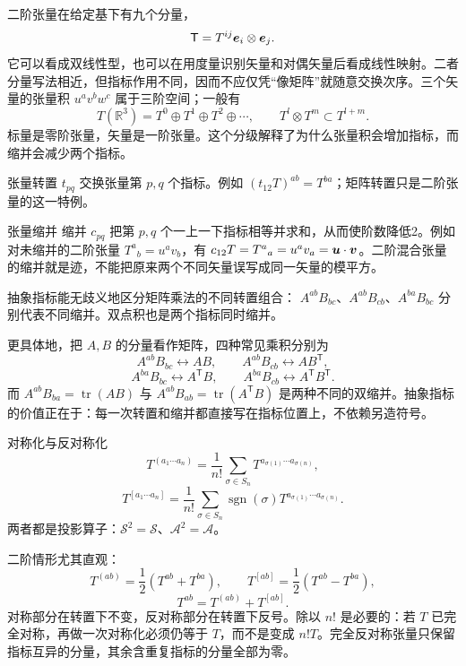 二阶张量在给定基下有九个分量，
\[
 \mathsf T=T^{ij}\bm{e}_i\otimes\bm{e}_j.
\]
它可以看成双线性型，也可以在用度量识别矢量和对偶矢量后看成线性映射。二者分量写法相近，但指标作用不同，因而不应仅凭“像矩阵”就随意交换次序。三个矢量的张量积
$u^av^bw^c$ 属于三阶空间；一般有
\[
 T(\mathbb R^3)=T^0\oplus T^1\oplus T^2\oplus\cdots,
 \qquad T^l\otimes T^m\subset T^{l+m}.
\]
标量是零阶张量，矢量是一阶张量。这个分级解释了为什么张量积会增加指标，而缩并会减少两个指标。

\begin{advdefinition}{张量转置}\label{advA3:def:tensor-transpose}
$t_{pq}$ 交换张量第 $p,q$ 个指标。例如
$(t_{12}T)^{ab}=T^{ba}$；矩阵转置只是二阶张量的这一特例。
\end{advdefinition}

\begin{advdefinition}{张量缩并}\label{advA3:def:contraction}
缩并 $c_{pq}$ 把第 $p,q$ 个一上一下指标相等并求和，从而使阶数降低2。例如
对未缩并的二阶张量 $T^a{}_b=u^av_b$，有 $c_{12}T=T^a{}_a=u^av_a=\bm{u}\cdot\bm{v}$。二阶混合张量的缩并就是迹，不能把原来两个不同矢量误写成同一矢量的模平方。
\end{advdefinition}
抽象指标能无歧义地区分矩阵乘法的不同转置组合：
$A^{ab}B_{bc}$、$A^{ab}B_{cb}$、$A^{ba}B_{bc}$ 分别代表不同缩并。双点积也是两个指标同时缩并。

更具体地，把 $A,B$ 的分量看作矩阵，四种常见乘积分别为
\[
 A^{ab}B_{bc}\leftrightarrow AB,\qquad
 A^{ab}B_{cb}\leftrightarrow AB^{\mathsf T},
\]
\[
 A^{ba}B_{bc}\leftrightarrow A^{\mathsf T}B,\qquad
 A^{ba}B_{cb}\leftrightarrow A^{\mathsf T}B^{\mathsf T}.
\]
而
$A^{ab}B_{ba}=\operatorname{tr}(AB)$ 与
$A^{ab}B_{ab}=\operatorname{tr}(A^{\mathsf T}B)$
是两种不同的双缩并。抽象指标的价值正在于：每一次转置和缩并都直接写在指标位置上，不依赖另造符号。

\begin{advdefinition}{对称化与反对称化}\label{advA3:def:symmetrization}
\[
 T^{(a_1\cdots a_n)}=\frac1{n!}\sum_{\sigma\in S_n}
 T^{a_{\sigma(1)}\cdots a_{\sigma(n)}},
\]
\[
 T^{[a_1\cdots a_n]}=\frac1{n!}\sum_{\sigma\in S_n}
 \operatorname{sgn}(\sigma)T^{a_{\sigma(1)}\cdots a_{\sigma(n)}}.
\]
两者都是投影算子：$\mathcal S^2=\mathcal S$、$\mathcal A^2=\mathcal A$。
\end{advdefinition}

二阶情形尤其直观：
\[
 T^{(ab)}=\frac12(T^{ab}+T^{ba}),\qquad
 T^{[ab]}=\frac12(T^{ab}-T^{ba}),
\]
\[
 T^{ab}=T^{(ab)}+T^{[ab]}.
\]
对称部分在转置下不变，反对称部分在转置下反号。除以 $n!$ 是必要的：若 $T$ 已完全对称，再做一次对称化必须仍等于 $T$，而不是变成 $n!T$。完全反对称张量只保留指标互异的分量，其余含重复指标的分量全部为零。

